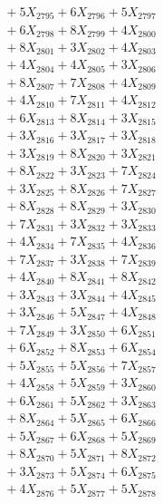 \documentclass[a4paper,10pt]{article}
\begin{document}
{\begin{align}
&\;  + 5 X_{2795} + 6 X_{2796} + 5 X_{2797} \\[0.3ex]
&\;  + 6 X_{2798} + 8 X_{2799} + 4 X_{2800} \\[0.5ex]\allowbreak
&\;  + 8 X_{2801} + 3 X_{2802} + 4 X_{2803} \\[0.3ex]
&\;  + 4 X_{2804} + 4 X_{2805} + 3 X_{2806} \\[0.3ex]
&\;  + 8 X_{2807} + 7 X_{2808} + 4 X_{2809} \\[0.3ex]
&\;  + 4 X_{2810} + 7 X_{2811} + 4 X_{2812} \\[0.3ex]
&\;  + 6 X_{2813} + 8 X_{2814} + 3 X_{2815} \\[0.3ex]
&\;  + 3 X_{2816} + 3 X_{2817} + 3 X_{2818} \\[0.3ex]
&\;  + 3 X_{2819} + 8 X_{2820} + 3 X_{2821} \\[0.3ex]
&\;  + 8 X_{2822} + 3 X_{2823} + 7 X_{2824} \\[0.3ex]
&\;  + 3 X_{2825} + 8 X_{2826} + 7 X_{2827} \\[0.3ex]
&\;  + 8 X_{2828} + 8 X_{2829} + 3 X_{2830} \\[0.5ex]\allowbreak
&\;  + 7 X_{2831} + 3 X_{2832} + 3 X_{2833} \\[0.3ex]
&\;  + 4 X_{2834} + 7 X_{2835} + 4 X_{2836} \\[0.3ex]
&\;  + 7 X_{2837} + 3 X_{2838} + 7 X_{2839} \\[0.3ex]
&\;  + 4 X_{2840} + 8 X_{2841} + 8 X_{2842} \\[0.3ex]
&\;  + 3 X_{2843} + 3 X_{2844} + 4 X_{2845} \\[0.3ex]
&\;  + 3 X_{2846} + 5 X_{2847} + 4 X_{2848} \\[0.3ex]
&\;  + 7 X_{2849} + 3 X_{2850} + 6 X_{2851} \\[0.3ex]
&\;  + 6 X_{2852} + 8 X_{2853} + 6 X_{2854} \\[0.3ex]
&\;  + 5 X_{2855} + 5 X_{2856} + 7 X_{2857} \\[0.3ex]
&\;  + 4 X_{2858} + 5 X_{2859} + 3 X_{2860} \\[0.5ex]\allowbreak
&\;  + 6 X_{2861} + 5 X_{2862} + 3 X_{2863} \\[0.3ex]
&\;  + 8 X_{2864} + 5 X_{2865} + 6 X_{2866} \\[0.3ex]
&\;  + 5 X_{2867} + 6 X_{2868} + 5 X_{2869} \\[0.3ex]
&\;  + 8 X_{2870} + 5 X_{2871} + 8 X_{2872} \\[0.3ex]
&\;  + 3 X_{2873} + 5 X_{2874} + 6 X_{2875} \\[0.3ex]
&\;  + 4 X_{2876} + 5 X_{2877} + 5 X_{2878} \\[0.3ex]

\end{align}}
\end{document}
